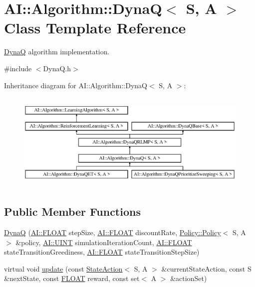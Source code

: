 \hypertarget{classAI_1_1Algorithm_1_1DynaQ}{\section{A\+I\+:\+:Algorithm\+:\+:Dyna\+Q$<$ S, A $>$ Class Template Reference}
\label{classAI_1_1Algorithm_1_1DynaQ}
}


\hyperlink{classAI_1_1Algorithm_1_1DynaQ}{Dyna\+Q} algorithm implementation.  




{\ttfamily \#include $<$Dyna\+Q.\+h$>$}

Inheritance diagram for A\+I\+:\+:Algorithm\+:\+:Dyna\+Q$<$ S, A $>$\+:\begin{figure}[H]
\begin{center}
\leavevmode
\includegraphics[height=4.794520cm]{classAI_1_1Algorithm_1_1DynaQ}
\end{center}
\end{figure}
\subsection*{Public Member Functions}
\begin{DoxyCompactItemize}
\item 
\hyperlink{classAI_1_1Algorithm_1_1DynaQ_aa543816270f72b2c4ac1f77fb818f792}{Dyna\+Q} (\hyperlink{namespaceAI_a41b74884a20833db653dded3918e05c3}{A\+I\+::\+F\+L\+O\+A\+T} step\+Size, \hyperlink{namespaceAI_a41b74884a20833db653dded3918e05c3}{A\+I\+::\+F\+L\+O\+A\+T} discount\+Rate, \hyperlink{classAI_1_1Algorithm_1_1Policy_1_1Policy}{Policy\+::\+Policy}$<$ S, A $>$ \&policy, \hyperlink{namespaceAI_ab6e14dc1e659854858a87e511f1439ec}{A\+I\+::\+U\+I\+N\+T} simulation\+Iteration\+Count, \hyperlink{namespaceAI_a41b74884a20833db653dded3918e05c3}{A\+I\+::\+F\+L\+O\+A\+T} state\+Transition\+Greediness, \hyperlink{namespaceAI_a41b74884a20833db653dded3918e05c3}{A\+I\+::\+F\+L\+O\+A\+T} state\+Transition\+Step\+Size)
\item 
virtual void \hyperlink{classAI_1_1Algorithm_1_1DynaQ_a4542226b17db4ed8a2c5ec17d37dc42f}{update} (const \hyperlink{classAI_1_1StateAction}{State\+Action}$<$ S, A $>$ \&current\+State\+Action, const S \&next\+State, const \hyperlink{namespaceAI_a41b74884a20833db653dded3918e05c3}{F\+L\+O\+A\+T} reward, const set$<$ A $>$ \&action\+Set)
\end{DoxyCompactItemize}
